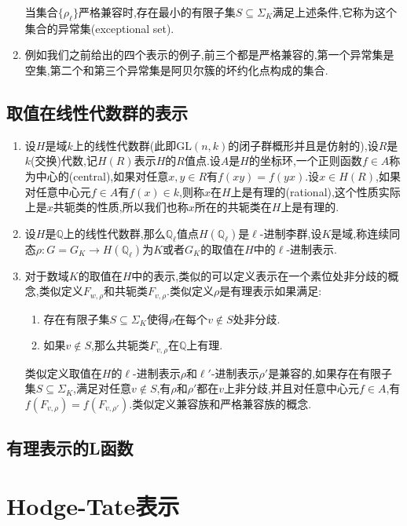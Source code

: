 \begin{enumerate}
    当集合$\{\rho_{\ell}\}$严格兼容时,存在最小的有限子集$S\subseteq\Sigma_K$满足上述条件,它称为这个集合的异常集(exceptional set).
    \item 例如我们之前给出的四个表示的例子,前三个都是严格兼容的,第一个异常集是空集,第二个和第三个异常集是阿贝尔簇的坏约化点构成的集合.
\end{enumerate}
\subsection{取值在线性代数群的表示}
\begin{enumerate}
	\item 设$H$是域$k$上的线性代数群(此即$\mathrm{GL}(n,k)$的闭子群概形并且是仿射的),设$R$是$k$(交换)代数,记$H(R)$表示$H$的$R$值点.设$A$是$H$的坐标环,一个正则函数$f\in A$称为中心的(central),如果对任意$x,y\in R$有$f(xy)=f(yx)$.设$x\in H(R)$,如果对任意中心元$f\in A$有$f(x)\in k$,则称$x$在$H$上是有理的(rational),这个性质实际上是$x$共轭类的性质,所以我们也称$x$所在的共轭类在$H$上是有理的.
	\item 设$H$是$\mathbb{Q}$上的线性代数群,那么$\mathbb{Q}_{\ell}$值点$H(\mathbb{Q}_{\ell})$是$\ell$-进制李群,设$K$是域,称连续同态$\rho: G=G_K\to H(\mathbb{Q}_{\ell})$为$K$或者$G_K$的取值在$H$中的$\ell$-进制表示.
	\item 对于数域$K$的取值在$H$中的表示,类似的可以定义表示在一个素位处非分歧的概念,类似定义$F_{w,\rho}$和共轭类$F_{v,\rho}$.类似定义$\rho$是有理表示如果满足:
	\begin{enumerate}[(1)]
		\item 存在有限子集$S\subseteq\Sigma_K$使得$\rho$在每个$v\not\in S$处非分歧.
		\item 如果$v\not\in S$,那么共轭类$F_{v,\rho}$在$\mathbb{Q}$上有理.
	\end{enumerate}

    类似定义取值在$H$的$\ell$-进制表示$\rho$和$\ell'$-进制表示$\rho'$是兼容的,如果存在有限子集$S\subseteq\Sigma_K$,满足对任意$v\not\in S$,有$\rho$和$\rho'$都在$v$上非分歧,并且对任意中心元$f\in A$,有$f(F_{v,\rho})=f(F_{v,\rho'})$.类似定义兼容族和严格兼容族的概念.
\end{enumerate}
\subsection{有理表示的L函数}


\newpage
\section{Hodge-Tate表示}
